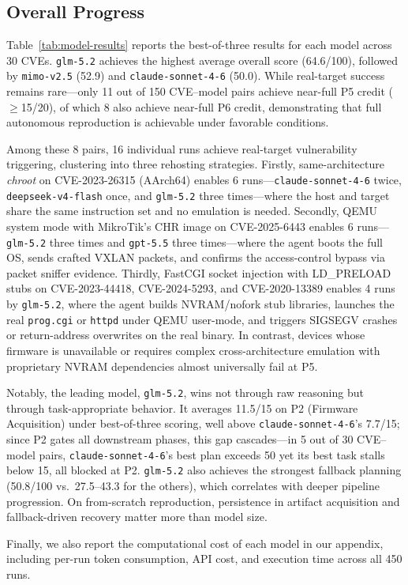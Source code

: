 \subsection{Overall Progress}
Table~\ref{tab:model-results} reports the best-of-three results for each model across 30 CVEs. \texttt{glm-5.2} achieves the highest average overall score (64.6/100), followed by \texttt{mimo-v2.5} (52.9) and \texttt{claude-sonnet-4-6} (50.0). While real-target success remains rare---only 11 out of 150 CVE--model pairs achieve near-full P5 credit ($\geq$15/20), of which 8 also achieve near-full P6 credit, demonstrating that full autonomous reproduction is achievable under favorable conditions.


Among these 8 pairs, 16 individual runs achieve real-target vulnerability triggering, clustering into three rehosting strategies. Firstly, same-architecture \textit{chroot} on CVE-2023-26315 (AArch64) enables 6 runs---\texttt{claude-sonnet-4-6} twice, \texttt{deepseek-v4-flash} once, and \texttt{glm-5.2} three times---where the host and target share the same instruction set and no emulation is needed. Secondly, QEMU system mode with MikroTik's CHR image on CVE-2025-6443 enables 6 runs---\texttt{glm-5.2} three times and \texttt{gpt-5.5} three times---where the agent boots the full OS, sends crafted VXLAN packets, and confirms the access-control bypass via packet sniffer evidence. Thirdly, FastCGI socket injection with LD\_PRELOAD stubs on CVE-2023-44418, CVE-2024-5293, and CVE-2020-13389 enables 4 runs by \texttt{glm-5.2}, where the agent builds NVRAM/nofork stub libraries, launches the real \texttt{prog.cgi} or \texttt{httpd} under QEMU user-mode, and triggers SIGSEGV crashes or return-address overwrites on the real binary. In contrast, devices whose firmware is unavailable or requires complex cross-architecture emulation with proprietary NVRAM dependencies almost universally fail at P5.


Notably, the leading model, \texttt{glm-5.2}, wins not through raw reasoning but through task-appropriate behavior. It averages 11.5/15 on P2 (Firmware Acquisition) under best-of-three scoring, well above \texttt{claude-sonnet-4-6}'s 7.7/15; since P2 gates all downstream phases, this gap cascades---in 5 out of 30 CVE--model pairs, \texttt{claude-sonnet-4-6}'s best plan exceeds 50 yet its best task stalls below 15, all blocked at P2. \texttt{glm-5.2} also achieves the strongest fallback planning (50.8/100 vs.\ 27.5--43.3 for the others), which correlates with deeper pipeline progression. On from-scratch reproduction, persistence in artifact acquisition and fallback-driven recovery matter more than model size.

Finally, we also report the computational cost of each model in our appendix, including per-run token consumption, API cost, and execution time across all 450 runs.
